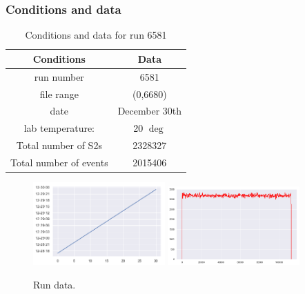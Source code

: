 \begin{frame}
\frametitle{Conditions and data}

\begin{table}[h!]
\caption{Conditions and data for run 6581}
\begin{center}
\begin{tabular}{|c|c|}
\hline
Conditions & Data \\
\hline
run number & 6581 \\
file range & (0,6680) \\
date & December 30th \\
lab temperature: & 20 $\deg$ \\
Total number of S2s  &  2328327 \\
Total number of events & 2015406 \\
\hline
\end{tabular}
\end{center}
\label{r6581.data}
\end{table}%
\end{frame}

\begin{frame}
\begin{figure}
  \begin{center}
      \includegraphics[width=0.45\textwidth]{img/r6581/runTime.png}
      \includegraphics[width=0.45\textwidth]{img/r6581/runEvt.png}
    \caption{Run data.}
  \end{center}
\end{figure}
\end{frame}

